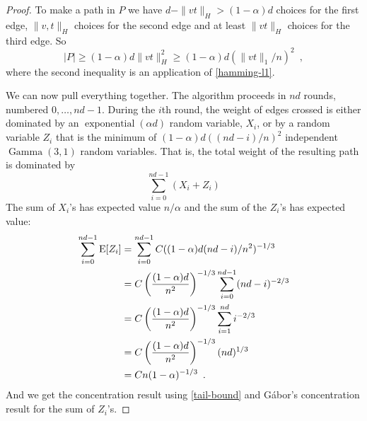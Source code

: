 \documentclass[lotsofwhite]{patmorin}
\DeclareMathOperator{\exponential}{exponential}
\DeclareMathOperator{\gammarv}{Gamma}
\begin{document}
\begin{proof}
   To make a path in $P$ we have $d-\|vt\|_H> (1-\alpha)d$ choices for
   the first edge, $\|v,t\|_H$ choices for the second edge and at least
   $\|vt\|_H$ choices for the third edge. So
   \[
     |P| \ge (1-\alpha)d\|vt\|_H^2 
         \ge (1-\alpha)d(\|vt\|_1/n)^2 
     \enspace ,
   \]
   where the second inequality is an application of \eqref{hamming-l1}.

   We can now pull everything together. The algorithm proceeds in $nd$
   rounds, numbered $0,\ldots,nd-1$.  During the $i$th round, the weight
   of edges crossed is either dominated by an $\exponential(\alpha d)$
   random variable, $X_i$, or by a random variable $Z_i$ that is the
   minimum of $(1-\alpha)d((nd-i)/n)^2$ independent $\gammarv(3,1)$
   random variables.  That is, the total weight of the resulting path
   is dominated by 
   \[
      \sum_{i=0}^{nd-1} (X_i + Z_i)
   \]
   The sum of $X_i$'s has expected value $n/\alpha$ and the sum of the $Z_i$'s
   has expected value:
   \begin{align*}
       \sum_{i=0}^{nd-1} \mathrm{E}[Z_i] 
       & = \sum_{i=0}^{nd-1} C((1-\alpha)d(nd-i)/n^2)^{-1/3} \\
       & = C\left(\frac{(1-\alpha)d}{n^2}\right)^{-1/3}\sum_{i=0}^{nd-1} (nd-i)^{-2/3} \\
       & = C\left(\frac{(1-\alpha)d}{n^2}\right)^{-1/3}\sum_{i=1}^{nd} i^{-2/3} \\
       & = C\left(\frac{(1-\alpha)d}{n^2}\right)^{-1/3}(nd)^{1/3} \\
       & = Cn(1-\alpha)^{-1/3} \enspace .
   \end{align*}
   And we get the concentration result using \eqref{tail-bound} and
   G\'abor's concentration result for the sum of $Z_i$'s.
\end{proof}
\end{document}
